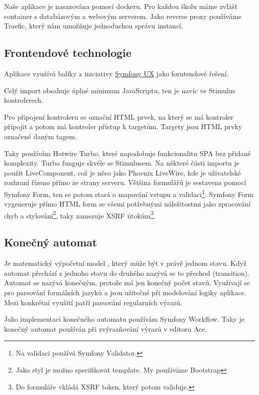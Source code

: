 Naše aplikace je nasazována pomocí dockeru. Pro každou školu máme zvlášť container s databázovým a webovým serverem.
Jako reverse proxy používáme Traefic, který nám umožňuje jednoduchou správu instancí.

\subsection{Frontendové technologie}

Aplikace využívá balíky z iniciativy \href{https://ux.symfony.com/}{Symfony UX} jako forntendové řešení.

Celý import obsahuje úplné minimum JavaScriptu, ten je navíc ve Stimulus kontrolerech. 

Pro připojení kontroleru se označní HTML prvek, na který se má kontroler připojit a potom má kontroler přístup k targetům. Targety jsou HTML prvky označené daným tagem.

Taky používám Hotwire Turbo\label{ux-turbo}, které napodobuje funkcionalitu SPA bez přidané komplexity. Turbo funguje skvěle se Stimulusem.
Na některé části importu je použit LiveComponent, což je něco jako Phoenix LiveWire, kde je uživatelské rozhraní řízeno přímo ze strany serveru. 
Většina formulářů je sestavena pomocí Symfony Form, ten se potom stará o mapování vstupu a validaci\footnote{Na validaci používá Symfony Validator.}.
Symfony Form vygeneruje přímo HTML form se všemi potřebnými náležitostmi jako zpracování chyb a stylování\footnote{Jako styl je možno specifikovat template. My používáme Bootstrap}, taky zamezuje XSRF útokům\footnote{Do formuláře vkládá XSRF token, který potom validuje.}.

\subsection{Konečný automat}\label{uvod:konecny-automat}
Je matematický výpočetní model , který může být v právě jednom stavu.\cite{wiki:finite-state-machine-en} Když automat přechází z jednoho stavu do druhého nazývá se to přechod (transition).
Automat se nazývá konečným, protože má jen konečný počet stavů.
Využívají se pro parsování formálních jazyků a jsou užitečné při modelování logiky aplikace.
Mezi konkrétní využití patří parsování regularních výrazů.\cite{wiki:finite-state-machine-cz}

Jako implementaci konečného automatu používám Symfony Workflow.
Taky je konečný automat používán při zvýrazňování výrazů v editoru Ace.



